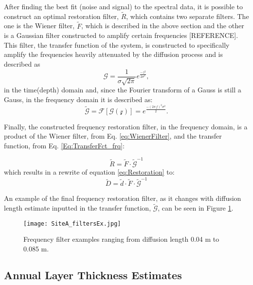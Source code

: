 \documentclass[../../CompleteThesis2/Complete_2ndDraft]{subfiles}
\begin{document}
After finding the best fit (noise and signal) to the spectral data, it is possible to construct an optimal restoration filter, $\tilde{R}$, which contains two separate filters. The one is the Wiener filter, $\tilde{F}$, which is described in the above section and the other is a Gaussian filter constructed to amplify certain frequencies [REFERENCE]. This filter, the transfer function of the system, is constructed to specifically amplify the frequencies heavily attenuated by the diffusion process and is described as
\begin{equation}
	\mathcal{G} = \frac{1}{\sigma\sqrt{2\pi}} e^{\frac{-z^2}{2\sigma^2}},
	\label{Eq:TransferFct_z}
\end{equation}
in the time(depth) domain and, since the Fourier transform of a Gauss is still a Gauss, in the frequency domain it is described as:
\begin{equation}
	\tilde{\mathcal{G}} = \mathcal{F}[\mathcal{G(z)}] = e^{\frac{-(2\pi\, f)^2\sigma^2}{2}}.
	\label{Eq:TransferFct_frq}
\end{equation}

Finally, the constructed frequency restoration filter, in the frequency domain, is a product of the Wiener filter, from Eq. \ref{eq:WienerFilter}, and the transfer function, from Eq. \ref{Eq:TransferFct_frq}:

\begin{equation}
	\tilde{R} =  \tilde{F} \cdot \tilde{\mathcal{G}}^{-1}
\end{equation}
which results in a rewrite of equation \ref{eq:Restoration} to:
\begin{equation}
	\tilde{D} = \tilde{d}\cdot\tilde{F}\cdot\tilde{\mathcal{G}}^{-1}
\end{equation}

An example of the final frequency restoration filter, as it changes with diffusion length estimate inputted in the transfer function, $\tilde{\mathcal{G}}$, can be seen in Figure \ref{fig:SiteA_filtersEx}.

\begin{figure}[h]
	\centering
	\texttt{[image: SiteA\_filtersEx.jpg]}
	\caption[Frequency filters example, Site A]{\small Frequency filter examples ranging from diffusion length 0.04 m to 0.085 m.}
	\label{fig:SiteA_filtersEx}
\end{figure}


\subsection[ALT from Spectral Analysis]{Annual Layer Thickness Estimates}
\label{Subsubsec:SignalAnalysis_SpectralAnalysis_ALT}
\end{document}
